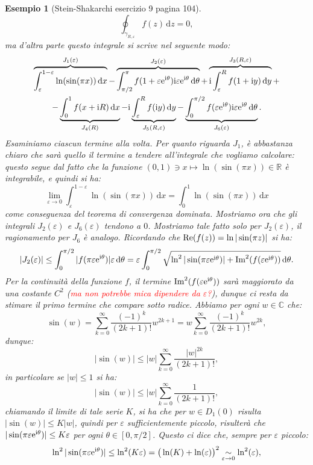 \documentclass[11pt]{book}
\theoremstyle{Definizione}
\theoremstyle{TeoremaProposizioneLemmaCorollarioCongettura}
\theoremstyle{OsservazioneNotaEsempio}
\newtheorem{myes}{Esempio}[section]
\newcommand{\R}{\mathbb{R}}
\newcommand{\C}{\mathbb{C}}
\newcommand{\Disc}[3][]{D^{#1}_{{#2}}({#3})}
\renewcommand{\Re}{\textup{Re}}
\renewcommand{\Im}{\textup{Im}}
\renewcommand{\i}{\textup{i}}
\newcommand{\e}{\textup{e}}
\renewcommand{\d}{\mathrm{d}}
\newcommand{\dz}{\,\d z}
\newcommand{\dx}{\,\d x}
\newcommand{\dy}{\,\d y}
\newcommand{\dtheta}{\, \d \theta}
\begin{document}
\begin{myes}[Stein-Shakarchi esercizio 9 pagina 104]
$$
\oint_{\gamma_{R,\varepsilon}} f(z)\dz = 0,
$$
ma d'altra parte questo integrale si scrive nel seguente modo:
\begin{multline*}
\overbrace{\int_{\varepsilon}^{1-\varepsilon} \ln(\sin(\pi x))\dx}^{J_1(\varepsilon)} - \overbrace{\int_{\pi/2}^{\pi} f(1+\varepsilon\e^{\i\theta})\i\varepsilon\e^{\i\theta}\dtheta}^{J_2(\varepsilon)} + \overbrace{\i \int_{\varepsilon}^{R} f(1+\i y)\dy}^{J_3(R,\varepsilon)} + \\
-\underbrace{\int_0^1 f(x+\i R)\dx}_{J_4(R)} - \i\underbrace{\int_\varepsilon^R f(\i y)\dy}_{J_5(R,\varepsilon)} - \underbrace{\int_0^{\pi/2} f(\varepsilon\e^{\i\theta})\i\varepsilon\e^{\i\theta}\dtheta}_{J_6(\varepsilon)}.
\end{multline*}
Esaminiamo ciascun termine alla volta. Per quanto riguarda $J_1$, è abbastanza chiaro che sarà quello il termine a tendere all'integrale che vogliamo calcolare: questo segue dal fatto che la funzione $(0,1) \ni x \longmapsto \ln(\sin(\pi x))\in \R$ è integrabile, e quindi si ha:
$$
\lim_{\varepsilon \to 0} \int_{\varepsilon}^{1-\varepsilon} \ln(\sin (\pi x))\dx = \int_{0}^{1} \ln(\sin(\pi x))\dx
$$
come conseguenza del teorema di convergenza dominata. Mostriamo ora che gli integrali $J_2(\varepsilon)$ e $J_6(\varepsilon)$ tendono a $0$. Mostriamo tale fatto solo per $J_2(\varepsilon)$, il ragionamento per $J_6$ è analogo. Ricordando che $\Re(f(z)) = \ln|\sin(\pi z)|$ si ha:
$$
|J_2(\varepsilon)| \leq \int_{0}^{\pi/2} |f(\pi \varepsilon\e^{\i\theta})|\varepsilon\dtheta = \varepsilon\int_{0}^{\pi/2} \sqrt{\ln^2|\sin(\pi \varepsilon\e^{\i\theta})|+\Im^2(f(\varepsilon\e^{\i\theta}))}\dtheta.
$$
Per la continuità della funzione $f$, il termine $\Im^2(f(\varepsilon\e^{\i\theta}))$ sarà maggiorato da una costante $C^2$ (\textcolor{red}{ma non potrebbe mica dipendere da $\varepsilon$?}), dunque ci resta da stimare il primo termine che compare sotto radice. Abbiamo per ogni $w\in \C$ che:
$$
\sin(w) = \sum_{k = 0}^\infty \frac{(-1)^k}{(2k+1)!}w^{2k+1} = w \sum_{k = 0}^\infty \frac{(-1)^k}{(2k+1)!}w^{2k},
$$
dunque:
$$
|\sin(w)| \leq |w| \sum_{k = 0}^\infty \frac{|w|^{2k}}{(2k+1)!},
$$
in particolare se $|w| \leq 1$ si ha:
$$
|\sin(w)| \leq |w| \sum_{k = 0}^\infty \frac{1}{(2k+1)!},
$$
chiamando il limite di tale serie $K$, si ha che per $w\in \Disc{1}{0}$ risulta $|\sin(w)|\leq K|w|$, quindi per $\varepsilon$ sufficientemente piccolo, risulterà che $|\sin(\pi \varepsilon\e^{\i\theta})| \leq K \varepsilon$ per ogni $\theta\in [0,\pi/2]$. Questo ci dice che, sempre per $\varepsilon$ piccolo:
$$
\ln^2|\sin(\pi \varepsilon\e^{\i\theta})| \leq \ln^2(K\varepsilon) = \big(\ln(K)+\ln(\varepsilon)\big)^2 \underset{\varepsilon\to 0}{\sim} \ln^2(\varepsilon),
$$
\end{myes}
\end{document}
